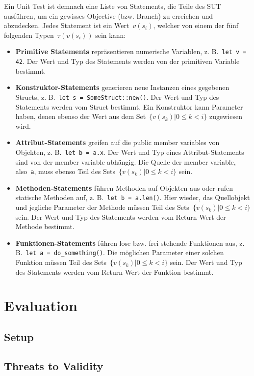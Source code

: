 \documentclass{article}
\begin{document}
Ein Unit Test ist demnach eine Liste von Statements, die Teile des \ac{SUT} ausführen, um ein gewisses Objective (bzw. Branch) zu erreichen und abzudecken. Jedes Statement ist ein Wert~$v(s_i)$, welcher von einem der fünf folgenden Typen~$\tau(v(s_i))$ sein kann:
\begin{itemize}
	\item \textbf{Primitive Statements} repräsentieren numerische Variablen, z. B.~\lstinline{let v = 42}. Der Wert und Typ des Statements werden von der primitiven Variable bestimmt. 
	\item \textbf{Konstruktor-Statements} generieren neue Instanzen eines gegebenen Structs, z. B.~\lstinline{let s = SomeStruct::new()}. Der Wert und Typ des Statements werden vom Struct bestimmt. Ein Konstruktor kann Parameter haben, denen ebenso der Wert aus dem Set~$\{v(s_k) | 0 \leq k < i\}$ zugewiesen wird.
	\item \textbf{Attribut-Statements} greifen auf die public member variables von Objekten, z. B.~\lstinline{let b = a.x}. Der Wert und Typ eines Attribut-Statements sind von der member variable abhängig. Die Quelle der member variable, also~\lstinline{a}, muss ebenso Teil des Sets~$\{v(s_k) | 0 \leq k < i\}$ sein. 
	\item \textbf{Methoden-Statements} führen Methoden auf Objekten aus oder rufen statische Methoden auf, z. B.~\lstinline{let b = a.len()}. Hier wieder, das Quellobjekt und jegliche Parameter der Methode müssen Teil des Sets~$\{v(s_k) | 0 \leq k < i\}$ sein. Der Wert und Typ des Statements werden vom Return-Wert der Methode bestimmt. 
	\item \textbf{Funktionen-Statements} führen lose bzw. frei stehende Funktionen aus, z. B.~\lstinline{let a = do_something()}. Die möglichen Parameter einer solchen Funktion müssen Teil des Sets~$\{v(s_k) | 0 \leq k < i\}$ sein. Der Wert und Typ des Statements werden vom Return-Wert der Funktion bestimmt. 
\end{itemize}

\section{Evaluation}
\subsection{Setup}
\subsection{Threats to Validity}
\end{document}
